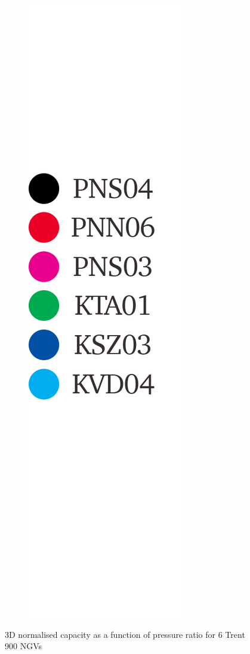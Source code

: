 \documentclass[a4paper, 11pt, oneside]{report}
\begin{document}
\begin{figure}[H]
\begin{subfigure}{.1125\textwidth}
		\includegraphics[width=\linewidth]{figs/t900_2d_capacity_trends_legend.png}
	\end{subfigure}
	\caption{3D normalised capacity as a function of pressure ratio for 6 Trent 900 NGVs}
	\label{fig:t900_3d_capacity_trends}
\end{figure}
\end{document}
